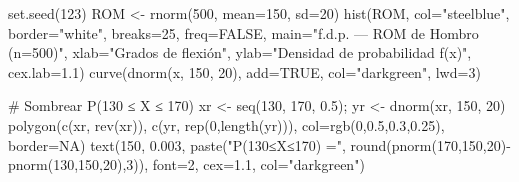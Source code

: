 \documentclass[
  letterpaper,
  DIV=11,
  numbers=noendperiod]{scrartcl}
\newenvironment{Shaded}{\begin{snugshade}}{\end{snugshade}}
\newcommand{\AttributeTok}[1]{\textcolor[rgb]{0.40,0.45,0.13}{#1}}
\newcommand{\CommentTok}[1]{\textcolor[rgb]{0.37,0.37,0.37}{#1}}
\newcommand{\ConstantTok}[1]{\textcolor[rgb]{0.56,0.35,0.01}{#1}}
\newcommand{\DecValTok}[1]{\textcolor[rgb]{0.68,0.00,0.00}{#1}}
\newcommand{\FloatTok}[1]{\textcolor[rgb]{0.68,0.00,0.00}{#1}}
\newcommand{\FunctionTok}[1]{\textcolor[rgb]{0.28,0.35,0.67}{#1}}
\newcommand{\NormalTok}[1]{\textcolor[rgb]{0.00,0.23,0.31}{#1}}
\newcommand{\OtherTok}[1]{\textcolor[rgb]{0.00,0.23,0.31}{#1}}
\newcommand{\SpecialCharTok}[1]{\textcolor[rgb]{0.37,0.37,0.37}{#1}}
\newcommand{\StringTok}[1]{\textcolor[rgb]{0.13,0.47,0.30}{#1}}
\begin{document}
\begin{Shaded}
\begin{Highlighting}[]
\FunctionTok{set.seed}\NormalTok{(}\DecValTok{123}\NormalTok{)}
\NormalTok{ROM }\OtherTok{\textless{}{-}} \FunctionTok{rnorm}\NormalTok{(}\DecValTok{500}\NormalTok{, }\AttributeTok{mean=}\DecValTok{150}\NormalTok{, }\AttributeTok{sd=}\DecValTok{20}\NormalTok{)}
\FunctionTok{hist}\NormalTok{(ROM, }\AttributeTok{col=}\StringTok{"steelblue"}\NormalTok{, }\AttributeTok{border=}\StringTok{"white"}\NormalTok{, }\AttributeTok{breaks=}\DecValTok{25}\NormalTok{, }\AttributeTok{freq=}\ConstantTok{FALSE}\NormalTok{,}
     \AttributeTok{main=}\StringTok{"f.d.p. — ROM de Hombro (n=500)"}\NormalTok{,}
     \AttributeTok{xlab=}\StringTok{"Grados de flexión"}\NormalTok{, }\AttributeTok{ylab=}\StringTok{"Densidad de probabilidad f(x)"}\NormalTok{, }\AttributeTok{cex.lab=}\FloatTok{1.1}\NormalTok{)}
\FunctionTok{curve}\NormalTok{(}\FunctionTok{dnorm}\NormalTok{(x, }\DecValTok{150}\NormalTok{, }\DecValTok{20}\NormalTok{), }\AttributeTok{add=}\ConstantTok{TRUE}\NormalTok{, }\AttributeTok{col=}\StringTok{"darkgreen"}\NormalTok{, }\AttributeTok{lwd=}\DecValTok{3}\NormalTok{)}

\CommentTok{\# Sombrear P(130 ≤ X ≤ 170)}
\NormalTok{xr }\OtherTok{\textless{}{-}} \FunctionTok{seq}\NormalTok{(}\DecValTok{130}\NormalTok{, }\DecValTok{170}\NormalTok{, }\FloatTok{0.5}\NormalTok{); yr }\OtherTok{\textless{}{-}} \FunctionTok{dnorm}\NormalTok{(xr, }\DecValTok{150}\NormalTok{, }\DecValTok{20}\NormalTok{)}
\FunctionTok{polygon}\NormalTok{(}\FunctionTok{c}\NormalTok{(xr, }\FunctionTok{rev}\NormalTok{(xr)), }\FunctionTok{c}\NormalTok{(yr, }\FunctionTok{rep}\NormalTok{(}\DecValTok{0}\NormalTok{,}\FunctionTok{length}\NormalTok{(yr))), }\AttributeTok{col=}\FunctionTok{rgb}\NormalTok{(}\DecValTok{0}\NormalTok{,}\FloatTok{0.5}\NormalTok{,}\FloatTok{0.3}\NormalTok{,}\FloatTok{0.25}\NormalTok{), }\AttributeTok{border=}\ConstantTok{NA}\NormalTok{)}
\FunctionTok{text}\NormalTok{(}\DecValTok{150}\NormalTok{, }\FloatTok{0.003}\NormalTok{, }\FunctionTok{paste}\NormalTok{(}\StringTok{"P(130≤X≤170) ="}\NormalTok{,}
    \FunctionTok{round}\NormalTok{(}\FunctionTok{pnorm}\NormalTok{(}\DecValTok{170}\NormalTok{,}\DecValTok{150}\NormalTok{,}\DecValTok{20}\NormalTok{)}\SpecialCharTok{{-}}\FunctionTok{pnorm}\NormalTok{(}\DecValTok{130}\NormalTok{,}\DecValTok{150}\NormalTok{,}\DecValTok{20}\NormalTok{),}\DecValTok{3}\NormalTok{)), }\AttributeTok{font=}\DecValTok{2}\NormalTok{, }\AttributeTok{cex=}\FloatTok{1.1}\NormalTok{, }\AttributeTok{col=}\StringTok{"darkgreen"}\NormalTok{)}
\end{Highlighting}
\end{Shaded}
\end{document}
